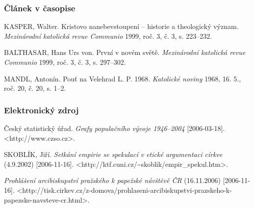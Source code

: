 \documentclass[12pt, a4paper, landscape]{article}
\newcommand{\vzduch}{\vspace{8mm}}
\begin{document}
\cite{krestanstviplatonismus}

\subsubsection{Článek v časopise}

KASPER, Walter. 
Kristovo nanebevstoupení – historie a theologický význam.
\emph{Mezinárodní katolická revue Communio} 
1999, 
roč. 3, č. 3, 
s. 223–232.

\cite{nanebevstoupeni}

\vzduch

BALTHASAR, Hans Urs von. 
První v novém světě.
\emph{Mezinárodní katolická revue Communio} 
1999, 
roč. 3, č. 3, 
s. 297–302.

\cite{prvni}

\vzduch

MANDL, Antonín. 
Pouť na Velehrad L. P. 1968.
\emph{Katolické noviny} 
1968, 
16. 5., 
roč. 20, č. 20, 
s. 1–2.

\cite{pout}

\subsubsection{Elektronický zdroj}

Český statistický úřad. 
\emph{Grafy populačního vývoje 1946–2004} 
[2006-03-18].
<http://www.czso.cz>.

\cite{populacnivyvoj}

\vzduch

SKOBLÍK, Jiří. 
\emph{Setkání empirie se spekulací v etické argumentaci církve} 
(4.9.2002)
[2006-11-16]. 
<http://ktf.cuni.cz/\textasciitilde skoblik/empir\_spekul.htm>.

\cite{empiriespekulace}

\vzduch

\emph{Prohlášení arcibiskupství pražského k papežské návštěvě ČR} 
(16.11.2006) 
[2006-11-16]. 
<http://tisk.cirkev.cz/z-domova/prohlaseni-arcibiskupstvi-prazskeho-k-papezske-navsteve-cr.html>.

\cite{papezskanavsteva}
\end{document}
